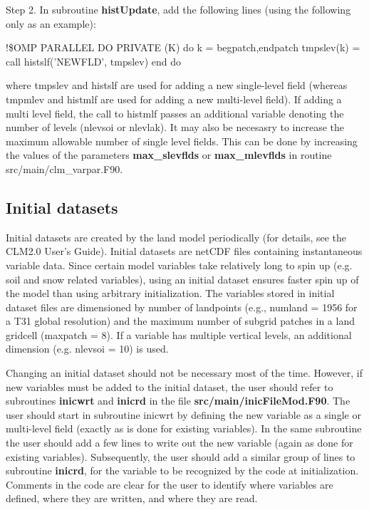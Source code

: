 \documentclass[]{article}
\begin{document}
\noindent 
Step 2. In subroutine {\bf histUpdate}, add the following lines (using
the following only as an example): \newline

\noindent !\$OMP PARALLEL DO PRIVATE (K)
\newline do k = begpatch,endpatch
\newline tmpslev(k) = call histslf('NEWFLD', tmpslev)
\newline end do

\noindent 
where tmpslev and histslf are used for adding a new single-level field
(whereas tmpmlev and histmlf are used for adding a new multi-level
field).  If adding a multi level field, the call to histmlf passes an
additional variable denoting the number of levels (nlevsoi or
nlevlak). It may also be necesasry to increase the maximum allowable
number of single level fields.  This can be done by increasing the
values of the parameters {\bf max\_slevflds} or {\bf max\_mlevflds} in
routine src/main/clm\_varpar.F90.

\subsection {Initial datasets}

Initial datasets are created by the land model periodically (for
details, see the CLM2.0 User's Guide). Initial datasets are netCDF
files containing instantaneous variable data. Since certain model
variables take relatively long to spin up (e.g. soil and snow related
variables), using an initial dataset ensures faster spin up of the
model than using arbitrary initialization.  The variables stored in
initial dataset files are dimensioned by number of landpoints (e.g.,
numland = 1956 for a T31 global resolution) and the maximum number of
subgrid patches in a land gridcell (maxpatch = 8).  If a variable has
multiple vertical levels, an additional dimension (e.g. nlevsoi = 10)
is used.

Changing an initial dataset should not be necessary most of the
time. However, if new variables must be added to the initial dataset,
the user should refer to subroutines {\bf inicwrt} and {\bf inicrd} in
the file {\bf src/main/inicFileMod.F90}. The user should start in
subroutine inicwrt by defining the new variable as a single or
multi-level field (exactly as is done for existing variables). In the
same subroutine the user should add a few lines to write out the new
variable (again as done for existing variables). Subsequently, the
user should add a similar group of lines to subroutine {\bf inicrd},
for the variable to be recognized by the code at
initialization. Comments in the code are clear for the user to
identify where variables are defined, where they are written, and
where they are read.
\end{document}
